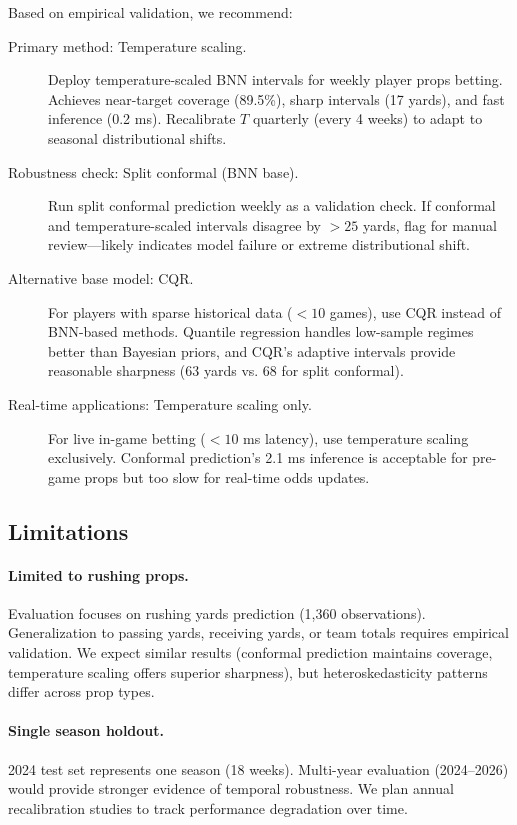 Based on empirical validation, we recommend:

\begin{description}
    \item[Primary method: Temperature scaling.] Deploy temperature-scaled BNN intervals for weekly player props betting. Achieves near-target coverage (89.5\%), sharp intervals (17 yards), and fast inference (0.2 ms). Recalibrate $T$ quarterly (every 4 weeks) to adapt to seasonal distributional shifts.

    \item[Robustness check: Split conformal (BNN base).] Run split conformal prediction weekly as a validation check. If conformal and temperature-scaled intervals disagree by $>25$ yards, flag for manual review—likely indicates model failure or extreme distributional shift.

    \item[Alternative base model: CQR.] For players with sparse historical data ($<10$ games), use CQR instead of BNN-based methods. Quantile regression handles low-sample regimes better than Bayesian priors, and CQR's adaptive intervals provide reasonable sharpness (63 yards vs. 68 for split conformal).

    \item[Real-time applications: Temperature scaling only.] For live in-game betting ($<10$ ms latency), use temperature scaling exclusively. Conformal prediction's 2.1 ms inference is acceptable for pre-game props but too slow for real-time odds updates.
\end{description}

\subsection{Limitations}\label{subsec:conformal-limitations-empirical}

\paragraph{Limited to rushing props.}
Evaluation focuses on rushing yards prediction (1,360 observations). Generalization to passing yards, receiving yards, or team totals requires empirical validation. We expect similar results (conformal prediction maintains coverage, temperature scaling offers superior sharpness), but heteroskedasticity patterns differ across prop types.

\paragraph{Single season holdout.}
2024 test set represents one season (18 weeks). Multi-year evaluation (2024--2026) would provide stronger evidence of temporal robustness. We plan annual recalibration studies to track performance degradation over time.

